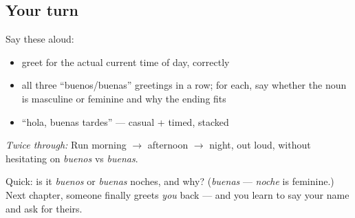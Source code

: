 \subsection*{Your turn}
Say these aloud:

\begin{itemize}
\raggedright
  \item greet for the actual current time of day, correctly
  \item all three \textquotedblleft{}buenos/buenas\textquotedblright{} greetings in a row; for each, say whether the noun is masculine or feminine and why the ending fits
  \item \textquotedblleft{}hola, buenas tardes\textquotedblright{} — casual + timed, stacked
\end{itemize}

\emph{Twice through:} Run morning $\to$ afternoon $\to$ night, out loud, without hesitating on \emph{buenos} vs \emph{buenas}.

\begin{tcolorbox}[breakable,colback=teal!4,colframe=teal!35!black,title={Before you move on}]
Quick: is it \emph{buenos} or \emph{buenas} noches, and why? (\emph{buenas} — \emph{noche} is feminine.) Next chapter, someone finally greets \emph{you} back — and you learn to say your name and ask for theirs.
\end{tcolorbox}

